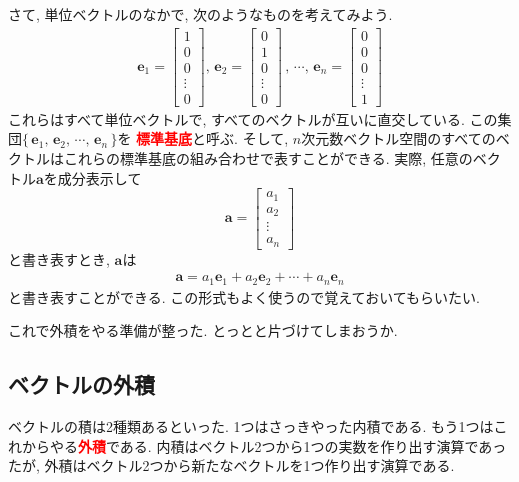 さて, 単位ベクトルのなかで, 次のようなものを考えてみよう. 
\begin{eqnarray}
\bm{e}_1 = \left[ 
 \begin{array}{c}
  1 \\
  0 \\
  0 \\
  \vdots \\
  0
 \end{array}
 \right]
  , \, 
 \bm{e}_2 = \left[ 
 \begin{array}{c}
  0 \\
  1 \\
  0 \\
  \vdots \\
  0
 \end{array}
 \right]
 \, , \, 
 \cdots 
 , \, 
 \bm{e}_n = \left[ 
 \begin{array}{c}
  0 \\
  0 \\
  0 \\
  \vdots \\
  1
 \end{array}
 \right]
 \label{eq:hyoujunnkitei}
\end{eqnarray}
これらはすべて単位ベクトルで, すべてのベクトルが互いに直交している. 
この集団$\{ \, \bm{e}_1, \, \bm{e}_2, \, \cdots , \, \bm{e}_n \, \}$を
\textbf{\textcolor{red}{標準基底}}と呼ぶ. 
そして, $n$次元数ベクトル空間のすべてのベクトルはこれらの標準基底の組み合わせで表すことができる. 
実際, 任意のベクトル$\bm{a}$を成分表示して
$$
\bm{a} = \left[
 \begin{array}{c}
  a_1 \\
  a_2 \\
  \vdots \\
  a_n
 \end{array}
 \right]
$$
と書き表すとき, $\bm{a}$は
\begin{eqnarray}
\bm{a} = a_1 \bm{e}_1 + a_2 \bm{e}_2 + \cdots + a_n \bm{e}_n
\label{eq:veckiteihyougenn}
\end{eqnarray}
と書き表すことができる. この形式もよく使うので覚えておいてもらいたい. 

これで外積をやる準備が整った. とっとと片づけてしまおうか. 
\subsection{ベクトルの外積}
ベクトルの積は2種類あるといった. 1つはさっきやった内積である. もう1つはこれからやる\textbf{\textcolor{red}{外積}}である. 
内積はベクトル2つから1つの実数を作り出す演算であったが, 外積はベクトル2つから新たなベクトルを1つ作り出す演算である. 

